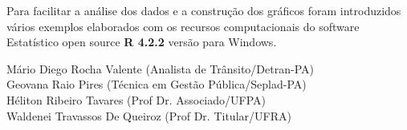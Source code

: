 Para facilitar a análise dos dados e a construção dos gráficos foram introduzidos vários exemplos elaborados com os recursos computacionais do software Estatístico open source \textbf{R 4.2.2} versão para Windows. 
\vst






\vst
\vst
\vst

\begin{centering}

\vst

\vsm

Mário Diego Rocha Valente (Analista de Trânsito/Detran-PA) \\
Geovana Raio Pires (Técnica em Gestão Pública/Seplad-PA)\\
Héliton Ribeiro Tavares (Prof Dr. Associado/UFPA)\\
Waldenei Travassos De Queiroz (Prof Dr. Titular/UFRA)\\



\end{centering}
